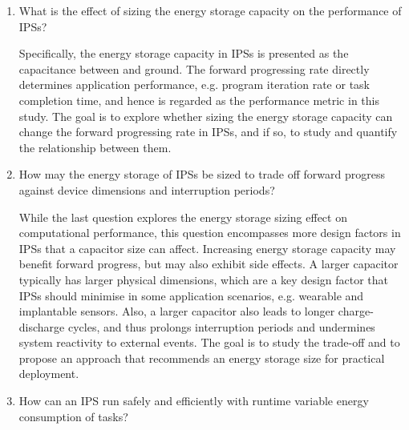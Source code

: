 \begin{enumerate}

\item What is the effect of sizing the energy storage capacity on the performance of IPSs? 

Specifically, the energy storage capacity in IPSs is presented as the capacitance between  and ground. 
The forward progressing rate directly determines application performance, e.g. program iteration rate or task completion time, and hence is regarded as the performance metric in this study. 
The goal is to explore whether sizing the energy storage capacity can change the forward progressing rate in IPSs, and if so, to study and quantify the relationship between them. 

\item How may the energy storage of IPSs be sized to trade off forward progress against device dimensions and interruption periods?

While the last question explores the energy storage sizing effect on computational performance, this question encompasses more design factors in IPSs that a capacitor size can affect. 
Increasing energy storage capacity may benefit forward progress, but may also exhibit side effects. 
A larger capacitor typically has larger physical dimensions, which are a key design factor that IPSs should minimise in some application scenarios, e.g. wearable and implantable sensors. 
Also, a larger capacitor also leads to longer charge-discharge cycles, and thus prolongs interruption periods and undermines system reactivity to external events. 
The goal is to study the trade-off and to propose an approach that recommends an energy storage size for practical deployment.

\item How can an IPS run safely and efficiently with runtime variable energy consumption of tasks?


\end{enumerate}
